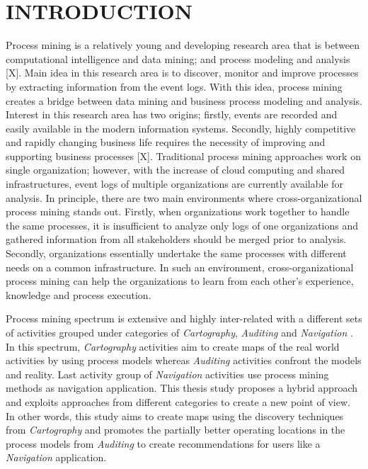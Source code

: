 \chapter{INTRODUCTION}
\label{chp:introduction}

Process mining is a relatively young and developing research area that is between computational intelligence and data mining; and process modeling and analysis [X]. Main idea in this research area is to discover, monitor and improve processes by extracting information from the event logs. With this idea, process mining creates a bridge between data mining and business process modeling and analysis. Interest in this research area has two origins; firstly, events are recorded and easily available in the modern information systems. Secondly, highly competitive and rapidly changing business life requires the necessity of improving and supporting business processes [X]. Traditional process mining approaches work on single organization; however, with the increase of cloud computing and shared infrastructures, event logs of multiple organizations are currently available for analysis. In principle, there are two main environments where cross-organizational process mining stands out. Firstly, when organizations work together to handle the same processes, it is insufficient to analyze only logs of one organizations and gathered information from all stakeholders should be merged prior to analysis. Secondly, organizations essentially undertake the same processes with different needs on a common infrastructure. In such an environment, cross-organizational process mining can help the organizations to learn from each other's experience, knowledge and process execution.

Process mining spectrum is extensive and highly inter-related with a different sets of activities grouped under categories of \textit{Cartography}, \textit{Auditing} and \textit{Navigation} \cite{van2011process}. In this spectrum, \textit{Cartography} activities aim to create maps of the real world activities by using process models whereas \textit{Auditing} activities confront the models and reality. Last activity group of \textit{Navigation} activities use process mining methods as navigation application. This thesis study proposes a hybrid approach and exploits approaches from different categories to create a new point of view. In other words, this study aims to create maps using the discovery techniques from \textit{Cartography} and promotes the partially better operating locations in the process models from \textit{Auditing} to create recommendations for users like a \textit{Navigation} application. 

